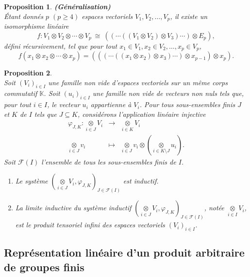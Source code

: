 \documentclass[a4paper, 14pt]{report}
\newtheorem{proposition}{Proposition}[section]
\begin{document}
\begin{onehalfspace}
{\begin{proposition}\textbf{(Généralisation)}  \cite{greub2012linear}\\
Étant donnés \(p\) \((p \geq 4)\) espaces vectoriels  \(V_1, V_2, \dots, V_p\), il existe un isomorphisme linéaire  
	\[
	f : V_1 \otimes V_2 \otimes \cdots \otimes V_p \ \cong \ ((\cdots((V_1 \otimes V_2) \otimes V_3) \cdots) \otimes E_p),
	\]
	défini récursivement, tel que pour tout \(x_1 \in V_1, x_2 \in V_2, \dots, x_p \in V_p\),
	\[
	f(x_1 \otimes x_2 \otimes \cdots \otimes x_p) = (((\cdots((x_1 \otimes x_2) \otimes x_3) \cdots) \otimes x_{p-1}) \otimes x_p).
	\]
\end{proposition}



\begin{proposition} \cite{Guichardet} \\
Soit $(V_i)_{i\in I}$ une famille non vide d’espaces vectoriels sur un même corps commutatif  $\mathbb{K}$. Soit $(u_i)_{i\in I}$ une famille non vide de vecteurs non nuls tels que, pour tout $i\in I$, le vecteur $u_i$ appartienne à $V_i$. Pour tous sous-ensembles finis $J$ et $K$ de $I$ tels que $J\subseteq K$, considérons l'application linéaire injective  
	$$\begin{array}{rlll}
		\varphi_{J,K}: \underset{i\in J}\otimes V_i& \longrightarrow& \underset{i\in K}\otimes V_i\\
		\underset{i\in J}\otimes v_i&\longmapsto& \underset{i\in J}\otimes v_i\otimes(\underset{i\in K\setminus J}\otimes u_i).
	\end{array}
	$$
Soit $\mathcal{F}(I)$ l'ensemble de tous les sous-ensembles finis de $I$. 
	\begin{enumerate}[label=\roman*)]
	\item Le système $(\underset{i\in J}\otimes V_i, \varphi_{J,K})_{J\in \mathcal{F}(I)}$ est inductif.
	\item La limite inductive du système inductif $(\underset{i\in J}\otimes V_i, \varphi_{J,K})_{J\in \mathcal{F}(I)}$, notée $\underset{i\in I}\otimes V_i$, est le produit tensoriel infini des espaces vectoriels $(V_i)_{i\in I}$.
\end{enumerate}
\end{proposition}


\subsection{Représentation linéaire d'un produit arbitraire de groupes finis}

}
\end{onehalfspace}
\end{document}
